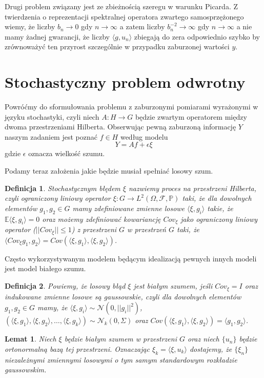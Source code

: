 \documentclass[10pt]{mwart}
\newtheorem{df}{Definicja}
\newtheorem{lm}{Lemat}
\begin{document}
Drugi problem związany jest ze zbieżnością szeregu w warunku Picarda. Z twierdzenia o reprezentacji spektralnej operatora zwartego samosprzężonego wiemy, że liczby $b_n\to 0$ gdy $n\to \infty$ a zatem liczby $b_n^{-2}\to \infty$ gdy $n \to \infty$ a nie mamy żadnej gwarancji, że liczby $\langle g,u_n\rangle$ zbiegają do zera odpowiednio szybko by zrównoważyć ten przyrost szczególnie w przypadku zaburzonej wartości $y$.


\section{Stochastyczny problem odwrotny}
Powróćmy do sformułowania problemu z zaburzonymi pomiarami wyrażonymi w języku stochastyki, czyli niech $A\colon H\to G$ będzie zwartym operatorem między dwoma przestrzeniami Hilberta. Obserwując pewną zaburzoną informację $Y$ naszym zadaniem jest poznać $f\in H$ według modelu
\begin{displaymath}
Y=Af+\epsilon\xi
\end{displaymath}
gdzie $\epsilon$ oznacza wielkość szumu.

Podamy teraz założenia jakie będzie musiał spełniać losowy szum. 

\begin{df}
Stochastycznym błędem $\xi$ nazwiemy proces na przestrzeni Hilberta, czyli ograniczony liniowy operator $\xi\colon G\to L^2(\Omega, \mathcal{F},\mathbb{P})$ taki, że dla dowolnych elementów $g_1,g_2\in G$ mamy zdefiniowane zmienne losowe $\langle \xi, g_i\rangle$ takie, że $\mathbb{E}\langle \xi, g_i\rangle =0$ oraz możemy zdefiniować kowariancję $Cov_{\xi}$ jako ograniczony liniowy operator ($||Cov_{\xi}||\leq 1$) z przestrzeni $G$ w przestrzeń $G$ taki, że $ \langle Cov_{\xi}g_1,g_2\rangle=Cov(\langle \xi,g_1\rangle,\langle \xi,g_2\rangle)$.
\end{df}

Często wykorzystywanym modelem będącym idealizacją pewnych innych modeli jest model białego szumu.
\begin{df}
Powiemy, że losowy błąd $\xi$ jest białym szumem, jeśli $Cov_{\xi}=I$ oraz indukowane zmienne losowe są gaussowskie, czyli dla dowolnych elementów $g_1,g_2\in G$ mamy, że $\langle \xi,g_i\rangle\sim \mathcal{N}(0,||g_i||^2)$, $(\langle \xi,g_1\rangle ,\langle \xi,g_2\rangle ,\dots ,\langle \xi,g_k\rangle )\sim \mathcal{N}_k(0, \Sigma)$ oraz $Cov(\langle \xi,g_1\rangle , \langle \xi , g_2\rangle)=\langle g_1, g_2\rangle$.
\end{df}
\begin{lm}
Niech $\xi$ będzie białym szumem w przestrzeni $G$ oraz niech $\{u_n\}$ będzie ortonormalną bazą tej przestrzeni. Oznaczając $\xi_k=\langle \xi,u_k\rangle$ dostajemy, że $\{\xi_n\}$ niezależnymi zmiennymi losowymi o tym samym standardowym rozkładzie gaussowskim.
\end{lm}
\end{document}
